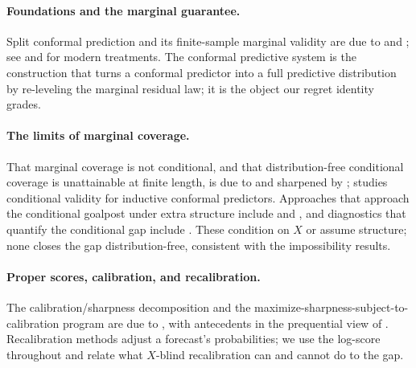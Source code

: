 \documentclass[11pt]{article}
\theoremstyle{definition}
\begin{document}
\paragraph{Foundations and the marginal guarantee.}
Split conformal prediction and its finite-sample marginal validity are due to
\citet{vovk2005algorithmic} and \citet{lei2018distribution}; see \citet{angelopoulos2023gentle}
and \citet{angelopoulos2025theoretical} for modern treatments. The conformal predictive
system \citep{vovk2019nonparametric} is the construction that turns a conformal predictor
into a full predictive distribution by re-leveling the marginal residual law; it is the
object our regret identity grades.

\paragraph{The limits of marginal coverage.}
That marginal coverage is not conditional, and that distribution-free conditional coverage
is unattainable at finite length, is due to \citet{lei2014distribution} and sharpened by
\citet{barber2021limits}; \citet{vovk2012conditional} studies conditional validity for
inductive conformal predictors. Approaches that approach the conditional goalpost under
extra structure include \citet{gibbs2025conditional} and \citet{laplante2026pivotal}, and
diagnostics that quantify the conditional gap include \citet{braun2025conditional}. These
condition on $X$ or assume structure; none closes the gap distribution-free, consistent with
the impossibility results.

\paragraph{Proper scores, calibration, and recalibration.}
The calibration/sharpness decomposition and the maximize-sharpness-subject-to-calibration
program are due to \citet{gneiting2007probabilistic,gneiting2007strictly}, with antecedents
in the prequential view of \citet{dawid1984present}. Recalibration methods
\citep{platt1999probabilistic,zadrozny2002transforming,guo2017calibration,kuleshov2018accurate}
adjust a forecast's probabilities; we use the log-score throughout and relate what
$X$-blind recalibration can and cannot do to the gap.
\end{document}
